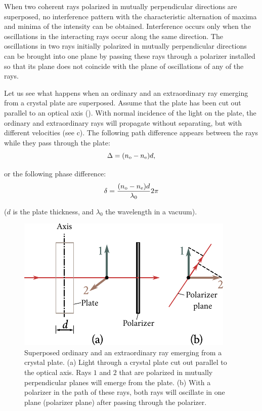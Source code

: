 When two coherent rays polarized in mutually perpendicular directions are superposed, no interference pattern with the characteristic alternation of maxima and minima of the intensity can be obtained.
Interference occurs only when the oscillations in the interacting rays occur along the same direction.
The oscillations in two rays initially polarized in mutually perpendicular directions can be brought into one plane by passing these rays through a polarizer installed so that its plane does not coincide with the plane of oscillations
of any of the rays.

Let us see what happens when an ordinary and an extraordinary ray emerging from a crystal plate are superposed.
Assume that the plate has been cut out parallel to an optical axis ().
With normal incidence of the light on the plate, the ordinary and extraordinary rays will propagate without separating, but with different velocities (see c).
The following path difference appears between the rays while they pass through the plate:
\begin{equation}\label{eq:19_11}
	\Delta = (n_{\text{o}} - n_{\text{e}}) d,
\end{equation}

\noindent
or the following phase difference:
\begin{equation}\label{eq:19_12}
	\delta = \frac{(n_{\text{o}} - n_{\text{e}}) d}{\lambda_0} 2\pi
\end{equation}

\noindent
($d$ is the plate thickness, and $\lambda_0$ the wavelength in a vacuum).

\begin{figure}[t]
	\begin{center}
		\includegraphics[scale=1]{figures/ch_19/fig_19_13.pdf}
        \caption[]{Superposed ordinary and an extraordinary ray emerging from a crystal plate. (a) Light through a crystal plate cut out parallel to the optical axis. Rays $1$ and $2$ that are polarized in mutually perpendicular planes will emerge from the plate. (b) With a polarizer in the path of these rays, both rays will oscillate in one plane (polarizer plane) after passing through the polarizer.}
		\label{fig:19_13}
	\end{center}
	\vspace{-0.8cm}
\end{figure}

